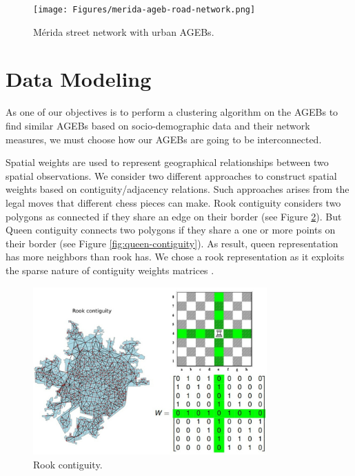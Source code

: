 \begin{figure}[h!]
	\centering
	\texttt{[image: Figures/merida-ageb-road-network.png]}
	\caption{Mérida street network with urban AGEBs.
		\label{fig:merida-ageb-street-network}}
\end{figure}

\section{Data Modeling}

As one of our objectives is to perform a clustering algorithm on the AGEBs to find similar AGEBs based on socio-demographic data and their network measures, we must choose how our AGEBs are going to be interconnected.

Spatial weights are used to represent geographical relationships between two spatial observations. We consider two different approaches to construct spatial weights based on contiguity/adjacency relations. Such approaches arises from the legal moves that different chess pieces can make. Rook contiguity considers two polygons as connected if they share an edge on their border (see Figure \ref{fig:rook-contiguity}). But Queen contiguity connects two polygons if they share a one or more points on their border (see Figure \ref{fig:queen-contiguity}). As result, queen representation has more neighbors than rook has. We chose a rook representation as it exploits the sparse nature of contiguity weights matrices \cite{rey_geo_ds_2020}.

\begin{figure}[h!]
	\centering
	\includegraphics[width=0.8\textwidth]{Figures/rook-contiguity.jpg}
	\caption{Rook contiguity.
		\label{fig:rook-contiguity}}
\end{figure}

